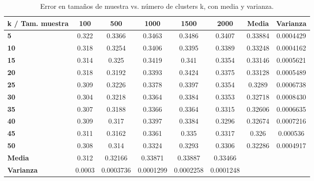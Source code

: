 \begin{table}[h!]
	\scriptsize
	\begin{tabularx}{\textwidth}{Xccccccc}
		\toprule
		\textbf{k / Tam. muestra} &
		\textbf{100} &
		\textbf{500} &
		\textbf{1000} &
		\textbf{1500} &
		\textbf{2000} &
		\textbf{Media} &
		\textbf{Varianza} \\ \midrule
		\textbf{5}  & 0.322 & 0.3366 & 0.3463 & 0.3486 & 0.3407 & 0.33884                         & 0.0004429                         \\
		\textbf{10} & 0.318 & 0.3254 & 0.3406 & 0.3395 & 0.3389 & 0.33248                         & \cellcolor[HTML]{D9EAD3}0.0004162 \\
		\textbf{15} & 0.314 & 0.325  & 0.3419 & 0.341  & 0.3354 & 0.33146                         & 0.0005621                       \\
		\textbf{20} & 0.318 & 0.3192 & 0.3393 & 0.3424 & 0.3375 & 0.33128                         & 0.0005489                        \\
		\textbf{25} & 0.309 & 0.3226 & 0.3378 & 0.3397 & 0.3354 & 0.3289                          & 0.0006738                           \\
		\textbf{30} & 0.304 & 0.3218 & 0.3364 & 0.3384 & 0.3353 & 0.32718                         & 0.0008430                        \\
		\textbf{35} & 0.307 & 0.3188 & 0.3366 & 0.3364 & 0.3315 & 0.32606                         & 0.0006635                       \\
		\textbf{40} & 0.309 & 0.317  & 0.3397 & 0.3384 & 0.3296 & 0.32674                         & 0.0007216                      \\
		\textbf{45} & 0.311 & 0.3162 & 0.3361 & 0.335  & 0.3317 & 0.326                           & 0.000536                      \\
		\textbf{50} & 0.308 & 0.314  & 0.3324 & 0.3293 & 0.3306 & \cellcolor[HTML]{D9EAD3}0.32286 & 0.0004917                         \\
		\midrule
		\textbf{Media} &
		\cellcolor[HTML]{D9EAD3}0.312 &
		0.32166 &
		0.33871 &
		0.33887 &
		0.33466 &
		 \\
		\textbf{Varianza} &
		0.0003 &
		0.0003736 &
		0.0001299 &
		0.0002258 &
		\cellcolor[HTML]{D9EAD3}0.0001248 &
		  \\
		\bottomrule
	\end{tabularx}
	\caption{Error en tamaños de muestra vs. número de clusters k, con media y varianza.}
	\label{tab:analisis-error-vs-k}
\end{table}

